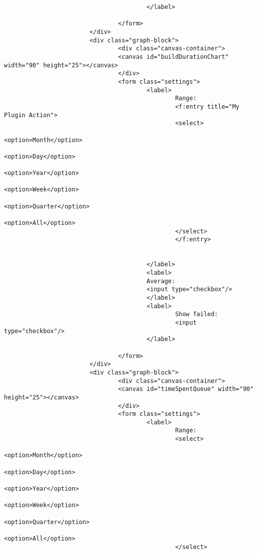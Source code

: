 \begin{lstlisting}
                                        </label>

                                </form>
                        </div>
                        <div class="graph-block">
                                <div class="canvas-container">
                                <canvas id="buildDurationChart" width="90" height="25"></canvas>
                                </div>
                                <form class="settings">
                                        <label>
                                                Range:
                                                <f:entry title="My Plugin Action">
                                                <select>
                                                        <option>Month</option>
                                                        <option>Day</option>
                                                        <option>Year</option>
                                                        <option>Week</option>
                                                        <option>Quarter</option>
                                                        <option>All</option>
                                                </select>
                                                </f:entry>


                                        </label>
                                        <label>
                                        Average:
                                        <input type="checkbox"/>
                                        </label>
                                        <label>
                                                Show failed:
                                                <input type="checkbox"/>
                                        </label>

                                </form>
                        </div>
                        <div class="graph-block">
                                <div class="canvas-container">
                                <canvas id="timeSpentQueue" width="90" height="25"></canvas>
                                </div>
                                <form class="settings">
                                        <label>
                                                Range:
                                                <select>
                                                        <option>Month</option>
                                                        <option>Day</option>
                                                        <option>Year</option>
                                                        <option>Week</option>
                                                        <option>Quarter</option>
                                                        <option>All</option>
                                                </select>


\end{lstlisting}
